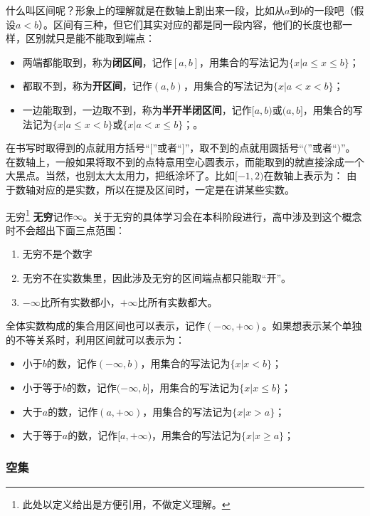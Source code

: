 什么叫区间呢？形象上的理解就是在数轴上割出来一段，比如从$a$到$b$的一段吧（假设$a<b$）。区间有三种，但它们其实对应的都是同一段内容，他们的长度也都一样，区别就只是能不能取到端点：
\begin{itemize}
\item 两端都能取到，称为\textbf{闭区间}，记作$[a,b]$，用集合的写法记为$\{x|a\leq x\leq b\}$；
\item 都取不到，称为\textbf{开区间}，记作$(a,b)$，用集合的写法记为$\{x|a< x<b\}$；
\item 一边能取到，一边取不到，称为\textbf{半开半闭区间}，记作$[a,b)$或$(a,b]$，用集合的写法记为$\{x|a\leq x< b\}$或$\{x|a< x\leq b\}$；。
\end{itemize}
在书写时取得到的点就用方括号“$[$”或者“$]$”，取不到的点就用圆括号“$($”或者“$)$”。
在数轴上，一般如果将取不到的点特意用空心圆表示，而能取到的就直接涂成一个大黑点。当然，也别太大太用力，把纸涂坏了。比如$[-1,2)$在数轴上表示为：
\addTODO{画个数轴的图，[-1,2)的区间}
由于数轴对应的是实数，所以在提及区间时，一定是在讲某些实数。

\begin{definition}{无穷\footnote{此处以定义给出是方便引用，不做定义理解。}}
\textbf{无穷}记作$\infty$。关于无穷的具体学习会在本科阶段进行，高中涉及到这个概念时不会超出下面三点范围：
\begin{enumerate}
\item 无穷不是个数字
\item 无穷不在实数集里，因此涉及无穷的区间端点都只能取“开”。
\item $-\infty$比所有实数都小，$+\infty$比所有实数都大。
\end{enumerate}
\end{definition}

全体实数构成的集合用区间也可以表示，记作$(-\infty,+\infty)$。如果想表示某个单独的不等关系时，利用区间就可以表示为：
\begin{itemize}
\item 小于$b$的数，记作$(-\infty,b)$，用集合的写法记为$\{x|x< b\}$；
\item 小于等于$b$的数，记作$(-\infty,b]$，用集合的写法记为$\{x|x\leq b\}$；
\item 大于$a$的数，记作$(a,+\infty)$，用集合的写法记为$\{x|x> a\}$；
\item 大于等于$a$的数，记作$[a,+\infty)$，用集合的写法记为$\{x|x\geq a\}$；
\end{itemize}

\subsubsection{空集}

